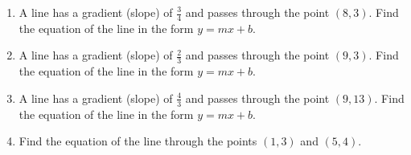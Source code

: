 \begin{enumerate}
\item A line has a gradient (slope) of $\displaystyle \frac{3}{4}$ and passes through the point $(8, 3)$. Find the equation of the line in the form $y=mx+b$.
\vspace{4cm}

\item A line has a gradient (slope) of $\displaystyle \frac{2}{3}$ and passes through the point $(9, 3)$. Find the equation of the line in the form $y=mx+b$.
    \vspace{4cm}

\item A line has a gradient (slope) of $\displaystyle \frac{4}{3}$ and passes through the point $(9, 13)$. Find the equation of the line in the form $y=mx+b$.
\vspace{3cm}

\item Find the equation of the line through the points $(1, 3)$ and $(5, 4)$.


\end{enumerate}
